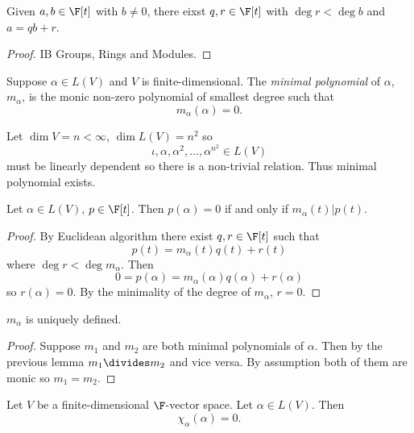 \documentclass[a4paper]{article}
\theoremstyle{definition}
\begin{document}
\begin{lemma}
  Given \(a, b \in \F[t]\) with \(b \neq 0\), there eixst \(q, r \in \F[t]\) with \(\deg r < \deg b\) and \(a = qb + r\).
\end{lemma}

\begin{proof}
  IB Groups, Rings and Modules.
\end{proof}

\begin{definition}
  Suppose \(\alpha \in L(V)\) and \(V\) is finite-dimensional. The \emph{minimal polynomial} of \(\alpha\), \(m_\alpha\), is the monic non-zero polynomial of smallest degree such that
  \[
    m_\alpha(\alpha) = 0.
  \]
\end{definition}

\begin{remark}
  Let \(\dim V = n < \infty\), \(\dim L(V) = n^2\) so
  \[
    \iota, \alpha, \alpha^2, \dots, \alpha^{n^2} \in L(V)
  \]
  must be linearly dependent so there is a non-trivial relation. Thus minimal polynomial exists.
\end{remark}

\begin{lemma}
  Let \(\alpha \in L(V)\), \(p \in \F[t]\). Then \(p(\alpha) = 0\) if and only if \(m_\alpha(t) | p(t)\).
\end{lemma}

\begin{proof}
  By Euclidean algorithm there exist \(q, r \in \F[t]\) such that
  \[
    p(t) = m_\alpha(t) q(t) + r(t)
  \]
  where \(\deg r < \deg m_\alpha\). Then
  \[
    0 = p(\alpha) = m_\alpha(\alpha) q(\alpha) + r(\alpha)
  \]
  so \(r(\alpha) = 0\). By the minimality of the degree of \(m_\alpha\), \(r = 0\).
\end{proof}

\begin{corollary}
  \(m_\alpha\) is uniquely defined.
\end{corollary}

\begin{proof}
  Suppose \(m_1\) and \(m_2\) are both minimal polynomials of \(\alpha\). Then by the previous lemma \(m_1 \divides m_2\) and vice versa. By assumption both of them are monic so \(m_1 = m_2\).
\end{proof}

\begin{theorem}
  Let \(V\) be a finite-dimensional \(\F\)-vector space. Let \(\alpha \in L(V)\). Then
  \[
    \chi_\alpha(\alpha) = 0.
  \]
\end{theorem}
\end{document}
